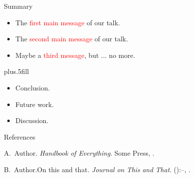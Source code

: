 \documentclass{beamer}
\begin{document}
\begin{frame}{Summary}
	\begin{itemize}
		\item The \textcolor{red}{first main message} of our talk.
		\item The \textcolor{red}{second main message} of our talk.
		\item Maybe a \textcolor{red}{third message}, but ... no more.
	\end{itemize}
	\vskip0pt plus.5fill
	\begin{itemize}
		\item Conclusion.
	\end{itemize}
	\begin{itemize}
		\item Future work.
		\item Discussion.
	\end{itemize}
\end{frame}

\begin{frame}{References}
	\begin{thebibliography}{2}
		\beamertemplatebookbibitems
		A.\ Author. \newblock\emph{Handbook of Everything}.\newblock
\textlatin{Some Press, }.

		\beamertemplatearticlebibitems
		B.\ Author.\newblock On this and that\emph{.}
\newblock\emph{Journal on This and That}. 
():--, 
.
	\end{thebibliography}
\end{frame}
\fi
\end{document}
